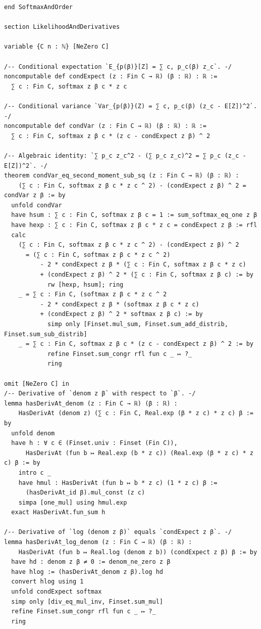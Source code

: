 {\begin{verbatim}
end SoftmaxAndOrder

section LikelihoodAndDerivatives

variable {C n : ℕ} [NeZero C]

/-- Conditional expectation `E_{p(β)}[Z] = ∑ c, p_c(β) z_c`. -/
noncomputable def condExpect (z : Fin C → ℝ) (β : ℝ) : ℝ :=
  ∑ c : Fin C, softmax z β c * z c

/-- Conditional variance `Var_{p(β)}(Z) = ∑ c, p_c(β) (z_c - E[Z])^2`. -/
noncomputable def condVar (z : Fin C → ℝ) (β : ℝ) : ℝ :=
  ∑ c : Fin C, softmax z β c * (z c - condExpect z β) ^ 2

/-- Algebraic identity: `∑ p_c z_c^2 - (∑ p_c z_c)^2 = ∑ p_c (z_c - E[Z])^2`. -/
theorem condVar_eq_second_moment_sub_sq (z : Fin C → ℝ) (β : ℝ) :
    (∑ c : Fin C, softmax z β c * z c ^ 2) - (condExpect z β) ^ 2 = condVar z β := by
  unfold condVar
  have hsum : ∑ c : Fin C, softmax z β c = 1 := sum_softmax_eq_one z β
  have hexp : ∑ c : Fin C, softmax z β c * z c = condExpect z β := rfl
  calc
    (∑ c : Fin C, softmax z β c * z c ^ 2) - (condExpect z β) ^ 2
      = (∑ c : Fin C, softmax z β c * z c ^ 2)
          - 2 * condExpect z β * (∑ c : Fin C, softmax z β c * z c)
          + (condExpect z β) ^ 2 * (∑ c : Fin C, softmax z β c) := by
            rw [hexp, hsum]; ring
    _ = ∑ c : Fin C, (softmax z β c * z c ^ 2
          - 2 * condExpect z β * (softmax z β c * z c)
          + (condExpect z β) ^ 2 * softmax z β c) := by
            simp only [Finset.mul_sum, Finset.sum_add_distrib, Finset.sum_sub_distrib]
    _ = ∑ c : Fin C, softmax z β c * (z c - condExpect z β) ^ 2 := by
            refine Finset.sum_congr rfl fun c _ ↦ ?_
            ring

omit [NeZero C] in
/-- Derivative of `denom z β` with respect to `β`. -/
lemma hasDerivAt_denom (z : Fin C → ℝ) (β : ℝ) :
    HasDerivAt (denom z) (∑ c : Fin C, Real.exp (β * z c) * z c) β := by
  unfold denom
  have h : ∀ c ∈ (Finset.univ : Finset (Fin C)),
      HasDerivAt (fun b ↦ Real.exp (b * z c)) (Real.exp (β * z c) * z c) β := by
    intro c _
    have hmul : HasDerivAt (fun b ↦ b * z c) (1 * z c) β :=
      (hasDerivAt_id β).mul_const (z c)
    simpa [one_mul] using hmul.exp
  exact HasDerivAt.fun_sum h

/-- Derivative of `log (denom z β)` equals `condExpect z β`. -/
lemma hasDerivAt_log_denom (z : Fin C → ℝ) (β : ℝ) :
    HasDerivAt (fun b ↦ Real.log (denom z b)) (condExpect z β) β := by
  have hd : denom z β ≠ 0 := denom_ne_zero z β
  have hlog := (hasDerivAt_denom z β).log hd
  convert hlog using 1
  unfold condExpect softmax
  simp only [div_eq_mul_inv, Finset.sum_mul]
  refine Finset.sum_congr rfl fun c _ ↦ ?_
  ring


\end{verbatim}}
